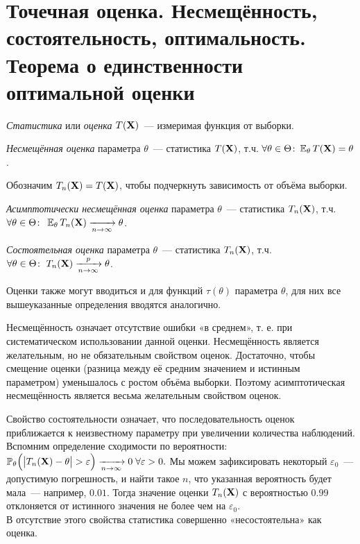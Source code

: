 \section{Точечная оценка. Несмещённость, состоятельность, оптимальность. Теорема о единственности оптимальной оценки}
\begin{defn}
    \textit{Статистика} или \textit{оценка} $T(\mathbf{X})$~--- измеримая функция от выборки.
\end{defn}

\begin{defn}
    \textit{Несмещённая оценка} параметра $\theta$~--- статистика $T(\mathbf{X})$, т.ч. $\forall \theta \in \Theta\colon \operatorname{\operatorname{\mathbb{E}}_{\theta}} T(\mathbf{X}) = \theta$.
\end{defn}

Обозначим $T_n(\mathbf{X}) = T(\mathbf{X})$, чтобы подчеркнуть зависимость от объёма выборки.
\begin{defn}
    \textit{Асимптотически несмещённая оценка} параметра $\theta$~--- статистика $T_n(\mathbf{X})$, т.ч. $\forall \theta \in \Theta \colon \; \operatorname{\operatorname{\mathbb{E}}_{\theta}} T_n(\mathbf{X}) \xrightarrow[n \to \infty]{} \theta$.
\end{defn}

\begin{defn}
    \textit{Состоятельная оценка} параметра $\theta$~--- статистика $T_n(\mathbf{X})$, т.ч. $\forall \theta \in \Theta \colon \; T_n(\mathbf{X}) \xrightarrow[n \to \infty]{p} \theta$.
\end{defn}

Оценки также могут вводиться и для функций $\tau(\theta)$ параметра $\theta$, для них все вышеуказанные определения вводятся аналогично.

Несмещённость означает отсутствие ошибки «в среднем», т. е. при систематическом использовании данной оценки. 
Несмещённость является желательным, но не обязательным свойством оценок. 
Достаточно, чтобы смещение оценки (разница между её средним значением и истинным параметром) уменьшалось с ростом объёма выборки. 
Поэтому асимптотическая несмещённость является весьма желательным свойством оценок. 

Свойство состоятельности означает, что последовательность оценок приближается к неизвестному параметру при увеличении количества наблюдений. 
Вспомним определение сходимости по вероятности: ${\operatorname{\operatorname{\mathbb{P}}_{\theta}} \Bigl(\bigl| T_n(\mathbf{X}) - \theta \bigr| > \varepsilon \Bigr) \xrightarrow[n \to \infty]{} 0} \; \forall  \varepsilon > 0.$
Мы можем зафиксировать некоторый $\varepsilon_0$~--- допустимую погрешность, и найти такое $n$, что указанная вероятность будет мала~--- например, $0.01$. 
Тогда значение оценки $T_n(\mathbf{X})$ с вероятностью $0.99$ отклоняется от истинного значения не более чем на $\varepsilon_0$.\\
В отсутствие этого свойства статистика совершенно «несостоятельна» как оценка.


